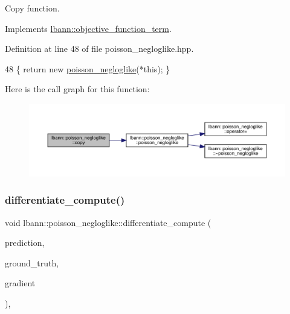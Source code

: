 Copy function. 

Implements \hyperlink{classlbann_1_1objective__function__term_ae98a4ec173a602ad55d1df20dadd4cb9}{lbann\+::objective\+\_\+function\+\_\+term}.



Definition at line 48 of file poisson\+\_\+negloglike.\+hpp.


\begin{DoxyCode}
48 \{ \textcolor{keywordflow}{return} \textcolor{keyword}{new} \hyperlink{classlbann_1_1poisson__negloglike_af2eabe95046d8995263a2df9e8e34f7d}{poisson\_negloglike}(*\textcolor{keyword}{this}); \}
\end{DoxyCode}
Here is the call graph for this function\+:\nopagebreak
\begin{figure}[H]
\begin{center}
\leavevmode
\includegraphics[width=350pt]{classlbann_1_1poisson__negloglike_a0c24847ce45940d823e27b274fb8b5c4_cgraph}
\end{center}
\end{figure}
\mbox{\label{classlbann_1_1poisson__negloglike_a9b6e6632bb6424551b38b8748ff64edd}} 
\subsubsection{\texorpdfstring{differentiate\+\_\+compute()}{differentiate\_compute()}}
{\footnotesize\ttfamily void lbann\+::poisson\+\_\+negloglike\+::differentiate\+\_\+compute (\begin{DoxyParamCaption}\item[{const \hyperlink{base_8hpp_a9a697a504ae84010e7439ffec862b470}{Abs\+Dist\+Mat} \&}]{prediction,  }\item[{const \hyperlink{base_8hpp_a9a697a504ae84010e7439ffec862b470}{Abs\+Dist\+Mat} \&}]{ground\+\_\+truth,  }\item[{\hyperlink{base_8hpp_a9a697a504ae84010e7439ffec862b470}{Abs\+Dist\+Mat} \&}]{gradient }\end{DoxyParamCaption})\hspace{0.3cm}{\ttfamily [override]}, {\ttfamily [virtual]}}

